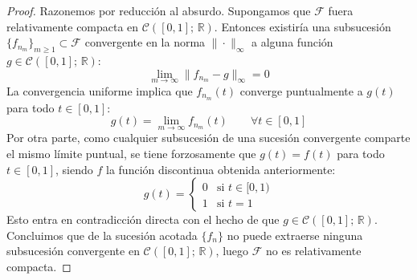 \begin{proof}
    Razonemos por reducción al absurdo. Supongamos que $\mathcal{F}$ fuera relativamente compacta en $\mathcal{C}([0, 1]; \, \mathbb{R})$. Entonces existiría una subsucesión $\{f_{n_m}\}_{m \geq 1} \subset \mathcal{F}$ convergente en la norma $\|\cdot\|_\infty$ a alguna función $g \in \mathcal{C}([0, 1]; \, \mathbb{R})$:
    \[
        \lim_{m \to \infty} \|f_{n_m} - g\|_\infty = 0
    \]
    La convergencia uniforme implica que $f_{n_m}(t)$ converge puntualmente a $g(t)$ para todo $t \in [0, 1]$:
    \[
        g(t) = \lim_{m \to \infty} f_{n_m}(t) \qquad \forall t \in [0, 1]
    \]
    Por otra parte, como cualquier subsucesión de una sucesión convergente comparte el mismo límite puntual, se tiene forzosamente que $g(t) = f(t)$ para todo $t \in [0, 1]$, siendo $f$ la función discontinua obtenida anteriormente:
    \[
        g(t) = \begin{cases}
            0 & \text{si } t \in [0, 1) \\
            1 & \text{si } t = 1
        \end{cases}
    \]
    Esto entra en contradicción directa con el hecho de que $g \in \mathcal{C}([0, 1]; \, \mathbb{R})$. Concluimos que de la sucesión acotada $\{f_n\}$ no puede extraerse ninguna subsucesión convergente en $\mathcal{C}([0, 1]; \, \mathbb{R})$, luego $\mathcal{F}$ no es relativamente compacta.
\end{proof}

